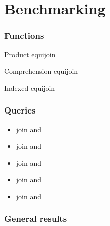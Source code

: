 \documentclass{beamer}
\begin{document}
\section{Benchmarking}
\begin{frame}
\frametitle{Functions}
\begin{block}{Product equijoin}
    \vspace{-4mm}
    {\scriptsize}
    \vspace{-7mm}
\end{block}\pause
\begin{block}{Comprehension equijoin}
    \vspace{-4mm}
    {\scriptsize}
    \vspace{-7mm}
\end{block}\pause
\begin{block}{Indexed equijoin}
    \vspace{-4mm}
    {\scriptsize}
    \vspace{-7mm}
\end{block}
\end{frame}
\begin{frame}
\frametitle{Queries}
\begin{itemize}
    \item {\large join  and
        }
        \vspace{1.5mm}\pause
    \item {\large join  and
        }
        \vspace{1.5mm}\pause
    \item {\large join  and
        }
        \vspace{1.5mm}\pause
    \item {\large join  and
        }
        \vspace{1.5mm}\pause
    \item {\large join  and
        }
\end{itemize}
\end{frame}

\begin{frame}
\frametitle{General results}

\begin{table}[p]
    \centering
    
    \caption{Percentage change of mean time to complete query `join onePercent
        and onePercent' when using indexed equijoin compared to other
    functions.}
    \label{tab:percentage-change-of-means-join-onePercent-and-onePercent}
\end{table}
\end{frame}
\end{document}

